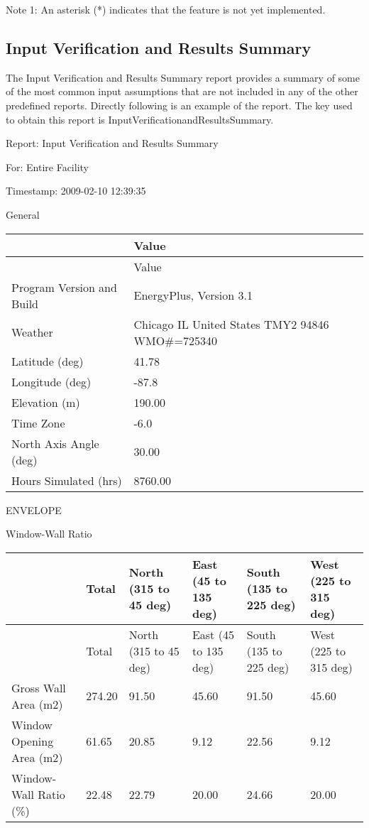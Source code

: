 Note 1: An asterisk (*) indicates that the feature is not yet implemented.

\subsection{Input Verification and Results Summary}\label{input-verification-and-results-summary}

The Input Verification and Results Summary report provides a summary of some of the most common input assumptions that are not included in any of the other predefined reports. Directly following is an example of the report. The key used to obtain this report is InputVerificationandResultsSummary.

Report: Input Verification and Results Summary

For: Entire Facility

Timestamp: 2009-02-10 12:39:35

General

\begin{longtable}[c]{>{\raggedright}p{2.04in}>{\raggedright}p{3.94in}}
\toprule 
~ & Value \tabularnewline
\midrule
\endfirsthead

\toprule 
~ & Value \tabularnewline
\midrule
\endhead

Program Version and Build & EnergyPlus, Version 3.1 \tabularnewline
Weather & Chicago IL United States TMY2 94846 WMO\#=725340 \tabularnewline
Latitude (deg) & 41.78 \tabularnewline
Longitude (deg) & -87.8 \tabularnewline
Elevation (m) & 190.00 \tabularnewline
Time Zone & -6.0 \tabularnewline
North Axis Angle (deg) & 30.00 \tabularnewline
Hours Simulated (hrs) & 8760.00 \tabularnewline
\bottomrule
\end{longtable}

ENVELOPE

Window-Wall Ratio

\begin{longtable}[c]{>{\raggedright}p{1.0in}>{\raggedright}p{1.0in}>{\raggedright}p{1.0in}>{\raggedright}p{1.0in}>{\raggedright}p{1.0in}>{\raggedright}p{1.0in}}
\toprule 
~ & Total & North (315 to 45 deg) & East (45 to 135 deg) & South (135 to 225 deg) & West (225 to 315 deg) \tabularnewline
\midrule
\endfirsthead

\toprule 
~ & Total & North (315 to 45 deg) & East (45 to 135 deg) & South (135 to 225 deg) & West (225 to 315 deg) \tabularnewline
\midrule
\endhead

Gross Wall Area (m2) & 274.20 & 91.50 & 45.60 & 91.50 & 45.60 \tabularnewline
Window Opening Area (m2) & 61.65 & 20.85 & 9.12 & 22.56 & 9.12 \tabularnewline
Window-Wall Ratio (\%) & 22.48 & 22.79 & 20.00 & 24.66 & 20.00 \tabularnewline
\bottomrule
\end{longtable}

